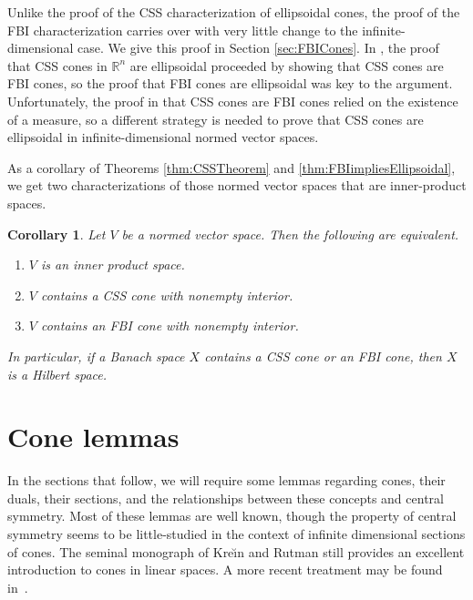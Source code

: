 \documentclass[10pt]{amsart}
\newtheorem{corollary}[thm]{Corollary}
\theoremstyle{definition}
\theoremstyle{remark}
\begin{document}
Unlike the proof of the CSS characterization of ellipsoidal cones,
the proof of the FBI characterization carries over with very
little change to the infinite-dimensional case.  We give this
proof in Section \ref{sec:FBICones}.  In \cite{JerMcA2013}, the
proof that CSS cones in ${\mathbb{R}}^{n}$ are ellipsoidal proceeded by
showing that CSS cones are FBI cones, so the proof that FBI cones
are ellipsoidal was key to the argument.  Unfortunately, the proof
in \cite{JerMcA2013} that CSS cones are FBI cones relied on the
existence of a measure, so a different strategy is needed to prove
that CSS cones are ellipsoidal in infinite-dimensional normed
vector spaces.

As a corollary of Theorems \ref{thm:CSSTheorem} and
\ref{thm:FBIimpliesEllipsoidal}, we get two characterizations of
those normed vector spaces that are inner-product spaces.

\begin{corollary}
   Let $V$ be a normed vector space.  Then the following are 
   equivalent.
   \begin{enumerate}
      \item  
      $V$ is an inner product space.
   
      \item
      $V$ contains a CSS cone with nonempty interior.
   
      \item
      $V$ contains an FBI cone with nonempty interior.
   \end{enumerate}
   In particular, if a Banach space $X$ contains a CSS cone or an
   FBI cone, then $X$ is a Hilbert space.
\end{corollary}

\section{Cone lemmas}
\label{sec:ConeLemmas}

In the sections that follow, we will require some lemmas regarding
cones, their duals, their sections, and the relationships between
these concepts and central symmetry.  Most of these lemmas are
well known, though the property of central symmetry seems to be
little-studied in the context of infinite dimensional sections of
cones.  The seminal monograph of Kre\u{\i}n and Rutman \cite{Krein}
still provides an excellent introduction to cones in linear
spaces.  A more recent treatment may be found
in~\cite{AliTou2007}.
\end{document}
